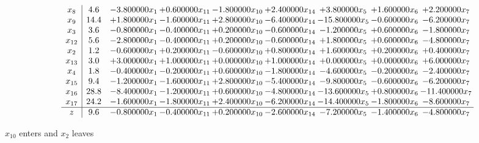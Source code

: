 \documentclass[10pt]{article}
\begin{document}
 \[\begin{array}{c| c c@{\hskip 2pt} c@{\hskip 2pt} c@{\hskip 2pt} c@{\hskip 2pt} c@{\hskip 2pt} c@{\hskip 2pt} c@{\hskip 2pt} }
 x_{8}   &  4.6 & -3.800000 x_{1} & + 0.600000 x_{11} & -1.800000 x_{10} & + 2.400000 x_{14} & + 3.800000 x_{5} & + 1.600000 x_{6} & + 2.200000 x_{7}\\
 x_{9}   &  14.4 & + 1.800000 x_{1} & -1.600000 x_{11} & + 2.800000 x_{10} & -6.400000 x_{14} & -15.800000 x_{5} & -0.600000 x_{6} & -6.200000 x_{7}\\
 x_{3}   &  3.6 & -0.800000 x_{1} & -0.400000 x_{11} & + 0.200000 x_{10} & -0.600000 x_{14} & -1.200000 x_{5} & + 0.600000 x_{6} & -1.800000 x_{7}\\
 x_{12}   &  5.6 & -2.800000 x_{1} & -0.400000 x_{11} & + 0.200000 x_{10} & -0.600000 x_{14} & + 1.800000 x_{5} & + 0.600000 x_{6} & -4.800000 x_{7}\\
 x_{2}   &  1.2 & -0.600000 x_{1} & + 0.200000 x_{11} & -0.600000 x_{10} & + 0.800000 x_{14} & + 1.600000 x_{5} & + 0.200000 x_{6} & + 0.400000 x_{7}\\
 x_{13}   &  3.0 & + 3.000000 x_{1} & + 1.000000 x_{11} & + 0.000000 x_{10} & + 1.000000 x_{14} & + 0.000000 x_{5} & + 0.000000 x_{6} & + 6.000000 x_{7}\\
 x_{4}   &  1.8 & -0.400000 x_{1} & -0.200000 x_{11} & + 0.600000 x_{10} & -1.800000 x_{14} & -4.600000 x_{5} & -0.200000 x_{6} & -2.400000 x_{7}\\
 x_{15}   &  9.4 & -1.200000 x_{1} & -1.600000 x_{11} & + 2.800000 x_{10} & -5.400000 x_{14} & -9.800000 x_{5} & -0.600000 x_{6} & -6.200000 x_{7}\\
 x_{16}   &  28.8 & -8.400000 x_{1} & -1.200000 x_{11} & + 0.600000 x_{10} & -4.800000 x_{14} & -13.600000 x_{5} & + 0.800000 x_{6} & -11.400000 x_{7}\\
 x_{17}   &  24.2 & -1.600000 x_{1} & -1.800000 x_{11} & + 2.400000 x_{10} & -6.200000 x_{14} & -14.400000 x_{5} & -1.800000 x_{6} & -8.600000 x_{7}\\
\hline
z    &  9.6 & -0.800000 x_{1} & -0.400000 x_{11} & + 0.200000 x_{10} & -2.600000 x_{14} & -7.200000 x_{5} & -1.400000 x_{6} & -4.800000 x_{7}\\
\end{array}\]


 $ x_{10} $ enters and $ x_{2} $ leaves 
\end{document}
